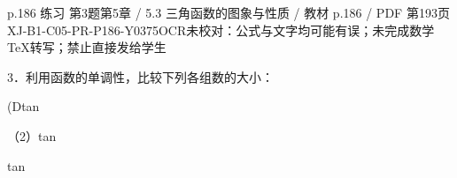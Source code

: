 \begin{bankitem}{p.186 练习 第3题}{第5章 / 5.3 三角函数的图象与性质 / 教材 p.186 / PDF 第193页}{XJ-B1-C05-PR-P186-Y0375}{OCR未校对：公式与文字均可能有误；未完成数学TeX转写；禁止直接发给学生}
\begin{ocrdraft}
\par
3．利用函数的单调性，比较下列各组数的大小：
\par
(Dtan
\par
（2）tan
\par
tan
\end{ocrdraft}
\end{bankitem}
